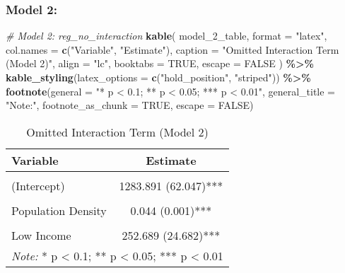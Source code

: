 \documentclass[
]{article}
\newenvironment{Shaded}{\begin{snugshade}}{\end{snugshade}}
\newcommand{\AttributeTok}[1]{\textcolor[rgb]{0.13,0.29,0.53}{#1}}
\newcommand{\CommentTok}[1]{\textcolor[rgb]{0.56,0.35,0.01}{\textit{#1}}}
\newcommand{\ConstantTok}[1]{\textcolor[rgb]{0.56,0.35,0.01}{#1}}
\newcommand{\FunctionTok}[1]{\textcolor[rgb]{0.13,0.29,0.53}{\textbf{#1}}}
\newcommand{\NormalTok}[1]{#1}
\newcommand{\SpecialCharTok}[1]{\textcolor[rgb]{0.81,0.36,0.00}{\textbf{#1}}}
\newcommand{\StringTok}[1]{\textcolor[rgb]{0.31,0.60,0.02}{#1}}
\begin{document}
\subsubsection{Model 2:}\label{model-2}

\begin{Shaded}
\begin{Highlighting}[]
\CommentTok{\# Model 2: reg\_no\_interaction}
\FunctionTok{kable}\NormalTok{(}
\NormalTok{  model\_2\_table,}
  \AttributeTok{format =} \StringTok{"latex"}\NormalTok{,}
  \AttributeTok{col.names =} \FunctionTok{c}\NormalTok{(}\StringTok{"Variable"}\NormalTok{, }\StringTok{"Estimate"}\NormalTok{),}
  \AttributeTok{caption =} \StringTok{"Omitted Interaction Term (Model 2)"}\NormalTok{,}
  \AttributeTok{align =} \StringTok{"lc"}\NormalTok{,}
  \AttributeTok{booktabs =} \ConstantTok{TRUE}\NormalTok{,}
  \AttributeTok{escape =} \ConstantTok{FALSE}
\NormalTok{) }\SpecialCharTok{\%\textgreater{}\%}
  \FunctionTok{kable\_styling}\NormalTok{(}\AttributeTok{latex\_options =} \FunctionTok{c}\NormalTok{(}\StringTok{"hold\_position"}\NormalTok{, }\StringTok{"striped"}\NormalTok{)) }\SpecialCharTok{\%\textgreater{}\%}
  \FunctionTok{footnote}\NormalTok{(}\AttributeTok{general =} \StringTok{"* p \textless{} 0.1; ** p \textless{} 0.05; *** p \textless{} 0.01"}\NormalTok{, }
           \AttributeTok{general\_title =} \StringTok{"Note:"}\NormalTok{, }
           \AttributeTok{footnote\_as\_chunk =} \ConstantTok{TRUE}\NormalTok{, }
           \AttributeTok{escape =} \ConstantTok{FALSE}\NormalTok{)}
\end{Highlighting}
\end{Shaded}

\begin{table}[!h]
\centering
\caption{\label{tab:unnamed-chunk-12}Omitted Interaction Term (Model 2)}
\centering
\begin{tabular}[t]{lc}
\toprule
Variable & Estimate\\
\midrule
\cellcolor{gray!10}{Spec 2: Omitted Interaction Term} & \cellcolor{gray!10}{}\\
(Intercept) & 1283.891 (62.047)***\\
\cellcolor{gray!10}{Food Program Density} & \cellcolor{gray!10}{8.053 (0.771)***}\\
Population Density & 0.044 (0.001)***\\
\cellcolor{gray!10}{Average Household Size (v\_CA21\_452)} & \cellcolor{gray!10}{-517.272 (22.461)***}\\
\addlinespace
Low Income & 252.689 (24.682)***\\
\bottomrule
\multicolumn{2}{l}{\rule{0pt}{1em}\textit{Note:} * p < 0.1; ** p < 0.05; *** p < 0.01}\\
\end{tabular}
\end{table}
\end{document}
